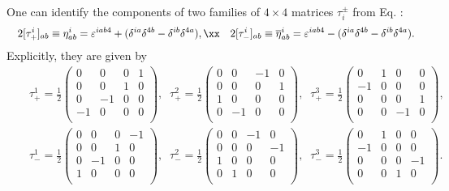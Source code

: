 \documentclass[12pt,epsf]{article}
\begin{document}
One can identify the components of two families of $4 \times 4$ matrices $\tau_i^\pm$ from Eq. :
\begin{eqnarray} \label{thooft-matrix}
&& 2 [\tau^i_+]_{ab} \equiv \eta^i_{ab}= {\varepsilon}^{iab4} + (\delta^{ia}\delta^{4b}
- \delta^{ib}\delta^{4a}), \xx
&& 2 [\tau^i_-]_{ab} \equiv {\overline \eta}^i_{ab} = {\varepsilon}^{iab4} - (\delta^{ia}\delta^{4b}
- \delta^{ib}\delta^{4a}).
\end{eqnarray}
Explicitly, they are given by \cite{joy-jhep,opy-jhep}
\begin{eqnarray} \label{t+}
&& \tau^{1}_+ = \frac{1}{2} \begin{pmatrix}
      0 & 0 & 0 & 1 \\
      0 & 0 & 1 & 0 \\
      0 & -1 & 0 & 0 \\
      -1 & 0 & 0 & 0 \\
             \end{pmatrix}, \;\;
  \tau^{2}_+ = \frac{1}{2} \begin{pmatrix}
      0 & 0 & -1 & 0 \\
      0 & 0 & 0 & 1 \\
      1 & 0 & 0 & 0 \\
      0 & -1 & 0 & 0 \\
    \end{pmatrix}, \;\;
  \tau^{3}_+ = \frac{1}{2} \begin{pmatrix}
      0 & 1 & 0 & 0 \\
      -1 & 0 & 0 & 0 \\
      0 & 0 & 0 & 1 \\
      0 & 0 & -1 & 0 \\
    \end{pmatrix}, \qquad \\
\label{t-}
&& \tau^{1}_- = \frac{1}{2} \begin{pmatrix}
      0 & 0 & 0 & -1 \\
      0 & 0 & 1 & 0 \\
      0 & -1 & 0 & 0 \\
      1 & 0 & 0 & 0 \\
    \end{pmatrix}, \;\;
  \tau^{2}_- = \frac{1}{2} \begin{pmatrix}
      0 & 0 & -1 & 0 \\
      0 & 0 & 0 & -1 \\
      1 & 0 & 0 & 0 \\
      0 & 1 & 0 & 0 \\
    \end{pmatrix}, \;\;
  \tau^{3}_- = \frac{1}{2} \begin{pmatrix}
      0 & 1 & 0 & 0 \\
      -1 & 0 & 0 & 0 \\
      0 & 0 & 0 & -1 \\
      0 & 0 & 1 & 0 \\
    \end{pmatrix}.
\end{eqnarray}
\end{document}
